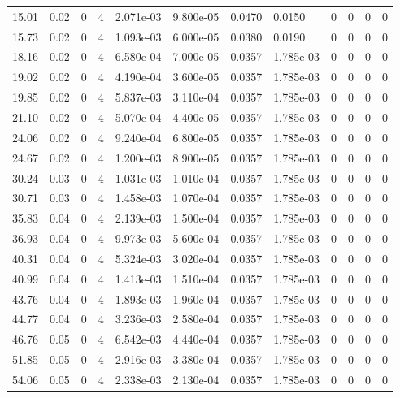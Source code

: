 \documentclass[preview]{standalone}
\begin{document}
{{\begin{tabular}{L{1.2cm}C{1.2cm} C{0.3cm}C{0.5cm} C{1.4cm}C{1.4cm} C{1.4cm}C{1.4cm} C{1.6cm}C{1.6cm} C{1.6cm}C{1.6cm}}
  15.01  &  0.02  & 0     &  4 &  2.071e-03  & 9.800e-05  &  0.0470&   0.0150& 0 & 0   &  0 & 0  \\ 
  15.73  &  0.02  & 0     &  4 &  1.093e-03  & 6.000e-05  &  0.0380&   0.0190& 0 & 0   &  0 & 0  \\ 
  18.16  &  0.02  & 0     &  4 &  6.580e-04  & 7.000e-05  &  0.0357&   1.785e-03& 0 & 0   &  0 & 0  \\ 
  19.02  &  0.02  & 0     &  4 &  4.190e-04  & 3.600e-05  &  0.0357&   1.785e-03& 0 & 0   &  0 & 0  \\ 
  19.85  &  0.02  & 0     &  4 &  5.837e-03  & 3.110e-04  &  0.0357&   1.785e-03& 0 & 0   &  0 & 0  \\ 
  21.10  &  0.02  & 0     &  4 &  5.070e-04  & 4.400e-05  &  0.0357&   1.785e-03& 0 & 0   &  0 & 0  \\ 
  24.06  &  0.02  & 0     &  4 &  9.240e-04  & 6.800e-05  &  0.0357&   1.785e-03& 0 & 0   &  0 & 0  \\ 
  24.67  &  0.02  & 0     &  4 &  1.200e-03  & 8.900e-05  &  0.0357&   1.785e-03& 0 & 0   &  0 & 0  \\ 
  30.24  &  0.03  & 0     &  4 &  1.031e-03  & 1.010e-04  &  0.0357&   1.785e-03& 0 & 0   &  0 & 0  \\ 
  30.71  &  0.03  & 0     &  4 &  1.458e-03  & 1.070e-04  &  0.0357&   1.785e-03& 0 & 0   &  0 & 0  \\ 
  35.83  &  0.04  & 0     &  4 &  2.139e-03  & 1.500e-04  &  0.0357&   1.785e-03& 0 & 0   &  0 & 0  \\ 
  36.93  &  0.04  & 0     &  4 &  9.973e-03  & 5.600e-04  &  0.0357&   1.785e-03& 0 & 0   &  0 & 0  \\ 
  40.31  &  0.04  & 0     &  4 &  5.324e-03  & 3.020e-04  &  0.0357&   1.785e-03& 0 & 0   &  0 & 0  \\ 
  40.99  &  0.04  & 0     &  4 &  1.413e-03  & 1.510e-04  &  0.0357&   1.785e-03& 0 & 0   &  0 & 0  \\ 
  43.76  &  0.04  & 0     &  4 &  1.893e-03  & 1.960e-04  &  0.0357&   1.785e-03& 0 & 0   &  0 & 0  \\ 
  44.77  &  0.04  & 0     &  4 &  3.236e-03  & 2.580e-04  &  0.0357&   1.785e-03& 0 & 0   &  0 & 0  \\ 
  46.76  &  0.05  & 0     &  4 &  6.542e-03  & 4.440e-04  &  0.0357&   1.785e-03& 0 & 0   &  0 & 0  \\ 
  51.85  &  0.05  & 0     &  4 &  2.916e-03  & 3.380e-04  &  0.0357&   1.785e-03& 0 & 0   &  0 & 0  \\ 
  54.06  &  0.05  & 0     &  4 &  2.338e-03  & 2.130e-04  &  0.0357&   1.785e-03& 0 & 0   &  0 & 0  \\ 

\end{tabular}}}
\end{document}
